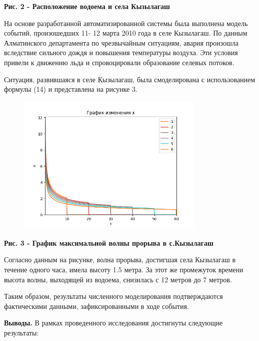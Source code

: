 {{\bfseries Рис. 2 - Расположение водоема и села Кызылагаш}

На основе разработанной автоматизированной системы была выполнена модель
событий, произошедших 11- 12 марта 2010 года в селе Кызылагаш. По данным
Алматинского департамента по чрезвычайным ситуациям, авария произошла
вследствие сильного дождя и повышения температуры воздуха. Эти условия
привели к движению льда и спровоцировали образование селевых потоков.

Ситуация, развившаяся в селе Кызылагаш, была смоделирована с
использованием формулы (14) и представлена на рисунке 3.

\begin{figure}[H]
	\centering
	\includegraphics[width=0.8\textwidth]{media/ict/image4}
	\caption*{}
\end{figure}


{\bfseries Рис. 3 - График максимальной волны прорыва в с.Кызылагаш}

Согласно данным на рисунке, волна прорыва, достигшая села Кызылагаш в
течение одного часа, имела высоту 1.5 метра. За этот же промежуток
времени высота волны, выходящей из водоема, снизилась с 12 метров до 7
метров.

Таким образом, результаты численного моделирования подтверждаются
фактическими данными, зафиксированными в ходе события.

{\bfseries Выводы.} В рамках проведенного исследования достигнуты следующие
результаты:

}
